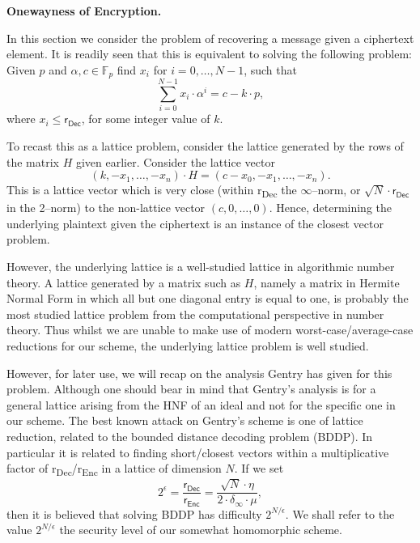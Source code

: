 \documentclass[a4paper, 12pt]{article}
\newcommand{\ndash}{\nobreakdash --}
\newcommand{\bb}[1]{\mathbb{#1}}
\newcommand{\tsf}[1]{\textsf{#1}}
\newcommand{\tbf}[1]{\textbf{#1}}
\newcommand{\tss}[1]{\textsubscript{#1}}
\newenvironment{bparagraph}[1]{
	\vspace{2ex}\noindent\tbf{#1. }\nolinebreak 
}{}
\begin{document}
	\begin{bparagraph}{Onewayness of Encryption}
		In this section we consider the problem of recovering a message given a ciphertext element.
		It is readily seen that this is	equivalent to solving the following problem: Given $p$ and $\alpha, c \in \bb{F}_p $ find $x_i$ for $i=0, \dots, N-1$, such that
		\[
			\sum_{i=0}^{N-1}{x_i \cdot \alpha^i} = c-k \cdot p,
		\]
		where $x_i \leqslant \tsf{r}_\tsf{Dec}$, for some integer value of $k$.
		
		To recast this as a lattice problem, consider the lattice generated by the rows of the matrix $H$ given earlier.
		Consider the lattice vector
		\[
			(k, -x_1, \dots, -x_n) \cdot H = (c-x_0, -x_1, \dots, -x_n).
		\]
		This is a lattice vector which is very close (within \tsf{r\tss{Dec}} the $\infty$\ndash norm, or $\sqrt{N} \cdot \tsf{r}_\tsf{Dec}$ in the 2\ndash norm) to the non-lattice vector $(c, 0, \dots, 0)$. Hence, determining the underlying plaintext given the ciphertext is an instance of the closest vector problem.
		
		However, the underlying lattice is a well-studied lattice in algorithmic number theory.
		A lattice generated by a matrix such as $H$, namely a matrix in Hermite Normal Form in which all but one diagonal entry is equal to one, is probably the most studied	lattice problem from the computational perspective in number theory.
		Thus whilst we are unable to make use of modern worst-case/average-case reductions for our scheme, the underlying lattice problem is well studied.
		
		However, for later use, we will recap on the analysis Gentry has given for this problem. 
		Although one should bear in mind that Gentry's analysis is for a general lattice arising from the HNF of an ideal and not for the specific one in our scheme.
		The best known attack on Gentry's scheme is one of lattice reduction, related to the bounded distance decoding problem (BDDP). 
		In particular it is	related to finding short/closest vectors within a multiplicative factor of \tsf{r\tss{Dec}/r\tss{Enc}} in a lattice of dimension $N$.
		If we set
		\[
			2^\epsilon = \frac{\tsf{r}_\tsf{Dec}}{\tsf{r}_\tsf{Enc}} = \frac{\sqrt{N} \cdot \eta}{2 \cdot \delta_\infty \cdot \mu},
		\]
		then it is believed that solving BDDP has difficulty $2^{N/\epsilon}$.
		We shall refer to the value $2^{N/\epsilon}$ the security level of our somewhat homomorphic scheme.
	\end{bparagraph}
	
\end{document}
